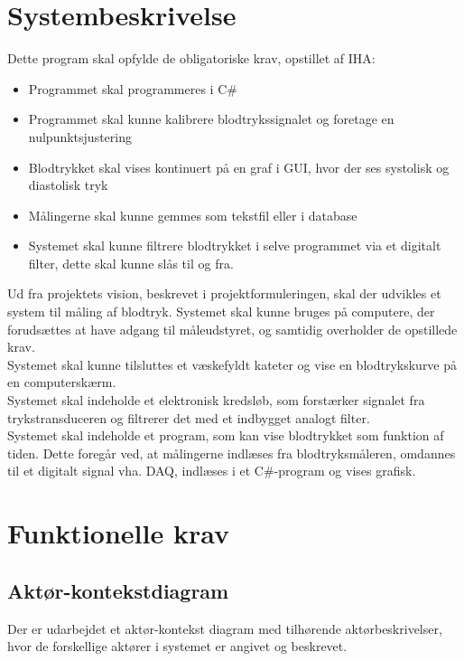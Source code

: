 \section{Systembeskrivelse}
Dette program skal opfylde de obligatoriske krav, opstillet af IHA:
\begin{itemize}
\item Programmet skal programmeres i C$\#$
\item Programmet skal kunne kalibrere blodtrykssignalet og foretage en nulpunktsjustering
\item Blodtrykket skal vises kontinuert på en graf i GUI, hvor der ses systolisk og diastolisk tryk
\item Målingerne skal kunne gemmes som tekstfil eller i database
\item Systemet skal kunne filtrere blodtrykket i selve programmet via et digitalt filter, dette skal kunne slås til og fra.
\end{itemize}
Ud fra projektets vision, beskrevet i projektformuleringen, skal der udvikles et system til måling af blodtryk. Systemet skal kunne bruges på computere, der forudsættes at have adgang til måleudstyret, og samtidig overholder de opstillede krav.
\\
Systemet skal kunne tilsluttes et væskefyldt kateter og vise en blodtrykskurve på en computerskærm. 
\\
Systemet skal indeholde et elektronisk kredsløb, som forstærker signalet fra trykstransduceren og filtrerer det med et indbygget analogt filter. 
\\
Systemet skal indeholde et program, som kan vise blodtrykket som funktion af tiden. Dette foregår ved, at målingerne indlæses fra blodtryksmåleren, omdannes til et digitalt signal vha. DAQ, indlæses i et C$\#$-program og vises grafisk.

\section{Funktionelle krav}


\subsection{Aktør-kontekstdiagram}
Der er udarbejdet et aktør-kontekst diagram med tilhørende aktørbeskrivelser, hvor de forskellige aktører i systemet er angivet og beskrevet.

